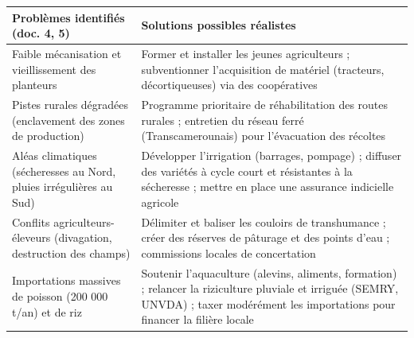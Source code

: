 \documentclass[11pt]{article}
\begin{document}
\begin{exoresolu}
\begin{center}
\begin{tabularx}{\linewidth}{|X|X|}\hline
\rowcolor{popblueL} \textbf{Problèmes identifiés (doc. 4, 5)} & \textbf{Solutions possibles réalistes} \\ \hline
Faible mécanisation et vieillissement des planteurs & Former et installer les jeunes agriculteurs ; subventionner l'acquisition de matériel (tracteurs, décortiqueuses) via des coopératives \\ \hline
Pistes rurales dégradées (enclavement des zones de production) & Programme prioritaire de réhabilitation des routes rurales ; entretien du réseau ferré (Transcamerounais) pour l'évacuation des récoltes \\ \hline
Aléas climatiques (sécheresses au Nord, pluies irrégulières au Sud) & Développer l'irrigation (barrages, pompage) ; diffuser des variétés à cycle court et résistantes à la sécheresse ; mettre en place une assurance indicielle agricole \\ \hline
Conflits agriculteurs-éleveurs (divagation, destruction des champs) & Délimiter et baliser les couloirs de transhumance ; créer des réserves de pâturage et des points d'eau ; commissions locales de concertation \\ \hline
Importations massives de poisson (200 000 t/an) et de riz & Soutenir l'aquaculture (alevins, aliments, formation) ; relancer la riziculture pluviale et irriguée (SEMRY, UNVDA) ; taxer modérément les importations pour financer la filière locale \\ \hline
\end{tabularx}
\end{center}


\end{exoresolu}
\end{document}
